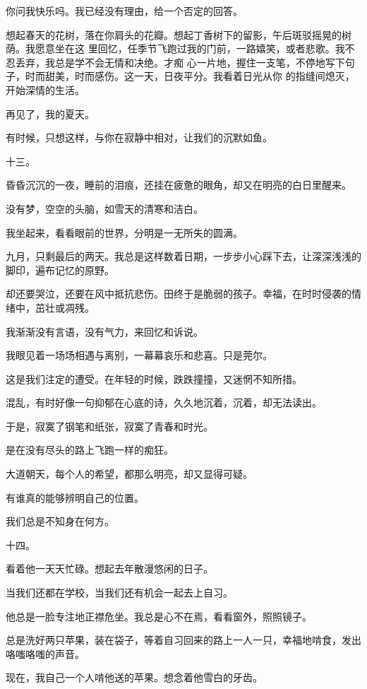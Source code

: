 \documentclass[12pt,a4paper]{article}
\def\blankrev{\vspace{1ex}}									%
\newcommand{\subpart}[1]{
	\begingroup \par
	\vspace{1ex} \centering #1
	\par \endgroup \nopagebreak[4]
}
\begin{document}
		你问我快乐吗。我已经没有理由，给一个否定的回答。

		想起春天的花树，落在你肩头的花瓣。想起丁香树下的留影，午后斑驳摇晃的树荫。我愿意坐在这
	里回忆，任季节飞跑过我的门前，一路嬉笑，或者悲歌。我不忍丢弃，我总是学不会无情和决绝。才痴
	心一片地，握住一支笔，不停地写下句子，时而甜美，时而感伤。这一天，日夜平分。我看着日光从你
	的指缝间熄灭，开始深情的生活。

		再见了，我的夏天。

	\endwriting



		有时候，只想这样，与你在寂静中相对，让我们的沉默如鱼。

		\subpart{十三。}

		昏昏沉沉的一夜，睡前的泪痕，还挂在疲惫的眼角，却又在明亮的白日里醒来。\par
		没有梦，空空的头脑，如雪天的清寒和洁白。\par
		我坐起来，看看眼前的世界，分明是一无所失的圆满。\par
		九月，只剩最后的两天。我总是这样数着日期，一步步小心踩下去，让深深浅浅的脚印，遍布记忆的原野。\par
		却还要哭泣，还要在风中抵抗悲伤。田终于是脆弱的孩子。幸福，在时时侵袭的情绪中，茁壮或凋残。\par
		我渐渐没有言语，没有气力，来回忆和诉说。\par
		我眼见着一场场相遇与离别，一幕幕哀乐和悲喜。只是莞尔。

		\blankrev
		这是我们注定的遭受。在年轻的时候，跌跌撞撞，又迷惘不知所措。\par
		混乱，有时好像一句抑郁在心底的诗，久久地沉着，沉着，却无法读出。\par
		于是，寂寞了钢笔和纸张，寂寞了青春和时光。\par
		是在没有尽头的路上飞跑一样的痴狂。\par
		大道朝天，每个人的希望，都那么明亮，却又显得可疑。\par
		有谁真的能够辨明自己的位置。\par
		我们总是不知身在何方。


		\subpart{十四。}

		看着他一天天忙碌。想起去年散漫悠闲的日子。\par
		当我们还都在学校，当我们还有机会一起去上自习。\par
		他总是一脸专注地正襟危坐。我总是心不在焉，看看窗外，照照镜子。\par
		总是洗好两只苹果，装在袋子，等着自习回来的路上一人一只，幸福地啃食，发出咯嗤咯嗤的声音。\par
		现在，我自己一个人啃他送的苹果。想念着他雪白的牙齿。
\end{document}
